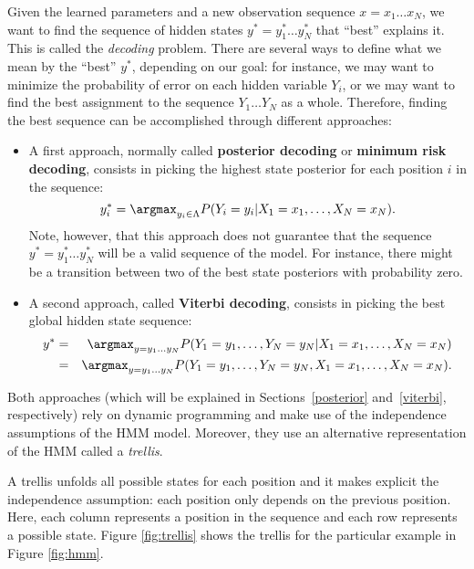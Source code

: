 Given the learned parameters and a new
observation sequence $x = x_1\ldots x_N$, we want to find the sequence of hidden states $y^* = y_1^* \ldots y_N^*$ that ``best'' explains it.
 This is called the \emph{decoding} problem. There are several ways to define what we mean by the ``best''
$y^*$, depending on our goal: for instance, we may want to minimize the probability of error
on each hidden
variable $Y_i$, or we may want to find the best assignment
to the sequence $Y_1\ldots Y_N$ as a whole. 
Therefore, finding the best sequence
can be accomplished through different approaches:

\begin{itemize}
\item A first approach, normally called \textbf{posterior decoding} or \textbf{minimum risk decoding}, consists
in picking the highest state posterior for each position $i$ in the sequence:
\begin{equation}
y_i^* = \argmax_{y_i \in \Lambda} P(Y_i=y_i | X_1=x_1,\ldots,X_N =x_N).
\end{equation}
Note, however, that this approach does not guarantee that the sequence $y^*=y_1^* \ldots y_N^*$ will be a
valid sequence of the model. For instance, there might be a transition
between two of the best state posteriors with probability zero. 

\item A second approach, called \textbf{Viterbi decoding}, consists in
picking the best global hidden state sequence: 
\begin{eqnarray}
y^* &=& \argmax_{y = y_1\ldots y_N} P(Y_1=y_1,\ldots, Y_N=y_N | X_1=x_1,\ldots,X_N =x_N)\nonumber\\
&=& \argmax_{y = y_1\ldots y_N} P(Y_1=y_1,\ldots, Y_N=y_N, X_1=x_1,\ldots,X_N =x_N).
\end{eqnarray}
\end{itemize}

Both approaches (which will be explained in Sections~\ref{posterior} and~\ref{viterbi}, respectively) rely on dynamic programming and make use of the
independence assumptions of the HMM model. Moreover, they use an alternative
representation of the HMM called a \emph{trellis}. 

A trellis unfolds all possible states for each position and it makes explicit the independence assumption: each position only
depends on the previous position. Here, each column represents a position in the sequence and each row represents a possible state. Figure \ref{fig:trellis} shows the
trellis for the particular example in Figure \ref{fig:hmm}. 

